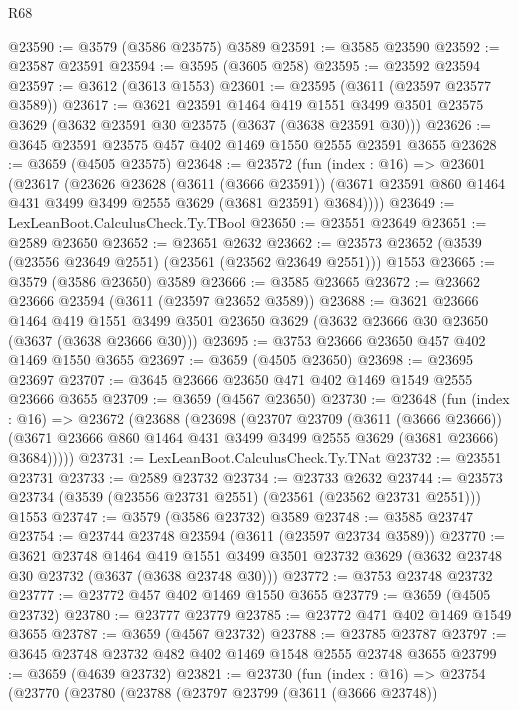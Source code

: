 \begin{lexlean}{R68}
\begin{coremodule}
@23590 := @3579 (@3586 @23575) @3589
@23591 := @3585 @23590
@23592 := @23587 @23591
@23594 := @3595 (@3605 @258)
@23595 := @23592 @23594
@23597 := @3612 (@3613 @1553)
@23601 := @23595 (@3611 (@23597 @23577 @3589))
@23617 := @3621
    @23591
    @1464
    @419
    @1551
    @3499
    @3501
    @23575
    @3629
    (@3632 @23591 @30 @23575 (@3637 (@3638 @23591 @30)))
@23626 := @3645 @23591 @23575 @457 @402 @1469 @1550 @2555 @23591 @3655
@23628 := @3659 (@4505 @23575)
@23648 := @23572
    (fun (index : @16) =>
    @23601
      (@23617
        (@23626
          @23628
          (@3611 (@3666 @23591))
          (@3671 @23591 @860 @1464 @431 @3499 @3499 @2555 @3629 (@3681 @23591) @3684))))
@23649 := LexLeanBoot.CalculusCheck.Ty.TBool
@23650 := @23551 @23649
@23651 := @2589 @23650
@23652 := @23651 @2632
@23662 := @23573 @23652 (@3539 (@23556 @23649 @2551) (@23561 (@23562 @23649 @2551))) @1553
@23665 := @3579 (@3586 @23650) @3589
@23666 := @3585 @23665
@23672 := @23662 @23666 @23594 (@3611 (@23597 @23652 @3589))
@23688 := @3621
    @23666
    @1464
    @419
    @1551
    @3499
    @3501
    @23650
    @3629
    (@3632 @23666 @30 @23650 (@3637 (@3638 @23666 @30)))
@23695 := @3753 @23666 @23650 @457 @402 @1469 @1550 @3655
@23697 := @3659 (@4505 @23650)
@23698 := @23695 @23697
@23707 := @3645 @23666 @23650 @471 @402 @1469 @1549 @2555 @23666 @3655
@23709 := @3659 (@4567 @23650)
@23730 := @23648
    (fun (index : @16) =>
    @23672
      (@23688
        (@23698
          (@23707
            @23709
            (@3611 (@3666 @23666))
            (@3671 @23666 @860 @1464 @431 @3499 @3499 @2555 @3629 (@3681 @23666) @3684)))))
@23731 := LexLeanBoot.CalculusCheck.Ty.TNat
@23732 := @23551 @23731
@23733 := @2589 @23732
@23734 := @23733 @2632
@23744 := @23573 @23734 (@3539 (@23556 @23731 @2551) (@23561 (@23562 @23731 @2551))) @1553
@23747 := @3579 (@3586 @23732) @3589
@23748 := @3585 @23747
@23754 := @23744 @23748 @23594 (@3611 (@23597 @23734 @3589))
@23770 := @3621
    @23748
    @1464
    @419
    @1551
    @3499
    @3501
    @23732
    @3629
    (@3632 @23748 @30 @23732 (@3637 (@3638 @23748 @30)))
@23772 := @3753 @23748 @23732
@23777 := @23772 @457 @402 @1469 @1550 @3655
@23779 := @3659 (@4505 @23732)
@23780 := @23777 @23779
@23785 := @23772 @471 @402 @1469 @1549 @3655
@23787 := @3659 (@4567 @23732)
@23788 := @23785 @23787
@23797 := @3645 @23748 @23732 @482 @402 @1469 @1548 @2555 @23748 @3655
@23799 := @3659 (@4639 @23732)
@23821 := @23730
    (fun (index : @16) =>
    @23754
      (@23770
        (@23780
          (@23788
            (@23797
              @23799
              (@3611 (@3666 @23748))

\end{coremodule}
\end{lexlean}
